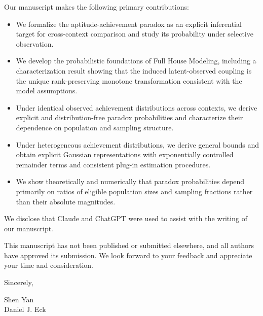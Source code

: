\documentclass[11pt]{article}
\begin{document}
Our manuscript makes the following primary contributions:

\begin{itemize}
    \item We formalize the aptitude-achievement paradox as an explicit inferential target for cross-context comparison and study its probability under selective observation.
    \item We develop the probabilistic foundations of Full House Modeling, including a characterization result showing that the induced latent-observed coupling is the unique rank-preserving monotone transformation consistent with the model assumptions.
    \item Under identical observed achievement distributions across contexts, we derive explicit and distribution-free paradox probabilities and characterize their dependence on population and sampling structure.
	\item Under heterogeneous achievement distributions, we derive general bounds and obtain explicit Gaussian representations with exponentially controlled remainder terms and consistent plug-in estimation procedures.
    \item We show theoretically and numerically that paradox probabilities depend primarily on ratios of eligible population sizes and sampling fractions rather than their absolute magnitudes.
\end{itemize}


We disclose that Claude and ChatGPT were used to assist with the writing of our manuscript.

This manuscript has not been published or submitted elsewhere, and all authors have approved its submission. We look forward to your feedback and appreciate your time and consideration.

Sincerely,

Shen Yan \\
Daniel J. Eck
\end{document}
